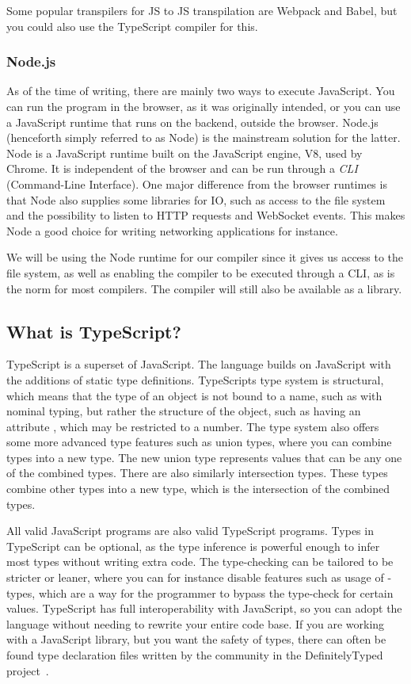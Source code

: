 Some popular transpilers for JS to JS transpilation are Webpack and Babel, but you could also use the TypeScript compiler for this.

\subsubsection{Node.js}\label{subsubsec:node}

As of the time of writing, there are mainly two ways to execute JavaScript.
You can run the program in the browser, as it was originally intended, or you can use a JavaScript runtime that runs on the backend, outside the browser.
Node.js (henceforth simply referred to as Node) is the mainstream solution for the latter.
Node is a JavaScript runtime built on the JavaScript engine, V8, used by Chrome.
It is independent of the browser and can be run through a \textit{CLI} (Command-Line Interface).
One major difference from the browser runtimes is that Node also supplies some libraries for IO, such as access to the file system and the possibility to listen to HTTP requests and WebSocket events.
This makes Node a good choice for writing networking applications for instance.

We will be using the Node runtime for our compiler since it gives us access to the file system, as well as enabling the compiler to be executed through a CLI, as is the norm for most compilers.
The compiler will still also be available as a library.

\subsection{What is TypeScript?}\label{subsec:what-is-typescript}

TypeScript is a superset of JavaScript.
The language builds on JavaScript with the additions of static type definitions.
TypeScripts type system is structural, which means that the type of an object is not bound to a name, such as with nominal typing, but rather the structure of the object, such as having an attribute , which may be restricted to a number.
The type system also offers some more advanced type features such as union types, where you can combine types into a new type.
The new union type represents values that can be any one of the combined types.
There are also similarly intersection types.
These types combine other types into a new type, which is the intersection of the combined types.

All valid JavaScript programs are also valid TypeScript programs.
Types in TypeScript can be optional, as the type inference is powerful enough to infer most types without writing extra code.
The type-checking can be tailored to be stricter or leaner, where you can for instance disable features such as usage of -types, which are a way for the programmer to bypass the type-check for certain values.
TypeScript has full interoperability with JavaScript, so you can adopt the language without needing to rewrite your entire code base.
If you are working with a JavaScript library, but you want the safety of types, there can often be found type declaration files written by the community in the DefinitelyTyped project~\cite{tswebsite}.

